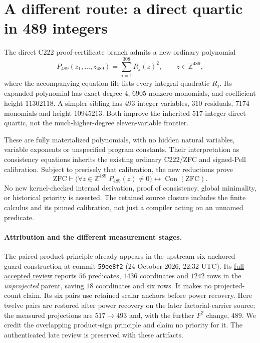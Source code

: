 \section{A different route: a direct quartic in 489 integers}
\label{sec:paired-direct}

The direct C222 proof-certificate branch admits a new ordinary polynomial
\[
 P_{489}(z_1,\ldots,z_{489})=\sum_{j=1}^{308}R_j(z)^2,
 \qquad z\in\mathbb Z^{489},
\]
where the accompanying equation file lists every integral quadratic $R_j$.
Its expanded polynomial has exact degree $4$, $6905$ nonzero monomials,
and coefficient height $11302118$.  A simpler sibling has $493$ integer
variables, $310$ residuals, $7174$ monomials and height $10945213$.
Both improve the inherited $517$-integer direct quartic, not the
much-higher-degree eleven-variable frontier.

These are fully materialized polynomials, with no hidden natural variables,
variable exponents or unspecified program constants. Their interpretation
as consistency equations inherits the existing ordinary C222/ZFC and
signed-Pell calibration. Subject to precisely that calibration, the new
reductions prove
\[
 \mathrm{ZFC}\vdash
 \bigl(\forall z\in\mathbb Z^{489}\;P_{489}(z)\ne0\bigr)
 \longleftrightarrow\operatorname{Con}(\mathrm{ZFC}).
\]
No new kernel-checked internal derivation, proof of consistency, global
minimality, or historical priority is asserted. The retained source closure
includes the finite calculus and its pinned calibration, not just a compiler
acting on an unnamed predicate.


\paragraph{Attribution and the different measurement stages.}
The paired-product principle already appears in the upstream six-anchored-
guard construction at commit \texttt{59ee8f2} (24 October 2026, 22:32 UTC).
Its \href{https://github.com/VladimirReshetnikov/ProveIt/blob/59ee8f21244635b42f706a74c4e9631226dd1f7c/Computability/DiophantineConsistency/reviews/shared-remainder-product-guards-root-peer.md}{full accepted review}
reports $56$ predicates, $1436$ coordinates and $1242$ rows in the
\emph{unprojected} parent, saving $18$ coordinates and six rows.
It makes no projected-count claim. Its six pairs use retained scalar
anchors before power recovery. Here twelve pairs are restored after
power recovery on the later factorial-carrier source; the measured
projections are $517\to493$ and, with the further $F^2$ change, $489$.
We credit the overlapping product-sign principle and claim no priority
for it. The authenticated late review is preserved with these artifacts.


